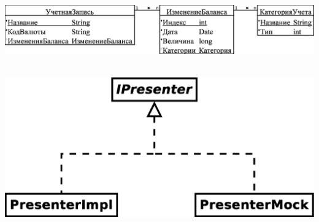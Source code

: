 \documentclass[russian,utf8,a1paper,nostitching,simple]{eskdgraph}
\begin{document}
\begin{ESKDdrawing}
  \vspace{4cm}
  \begin{minipage}{50cm}
    \centering
     \\
    \vspace{2cm}
    \centering
    \includegraphics[width=50cm]{fig/design_entities.eps}
  \end{minipage}
  \hspace{2cm}
  \begin{minipage}{20cm}
    \centering
     \\
    \vspace{2cm}
    \centering
    \includegraphics[width=20cm]{fig/implementation_testing_presenter.eps}
  \end{minipage}
\end{ESKDdrawing}

\setcounter{page}{1}
\begin{ESKDdrawing}
\end{ESKDdrawing}
\end{document}
